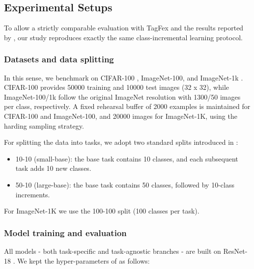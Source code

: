 \documentclass[letterpaper]{article} %
\begin{document}
\subsection{Experimental Setups}

To allow a strictly comparable evaluation with TagFex and the results reported by \citet{zheng2025task}, our study reproduces exactly the same class-incremental learning protocol. 

\subsubsection{Datasets and data splitting}
In this sense, we benchmark on CIFAR-100 \cite{Krizhevsky09}, ImageNet-100, and ImageNet-1k \cite{Deng:2009}. CIFAR-100 provides 50000 training and 10000 test images (32 x 32), while ImageNet-100/1k follow the original ImageNet resolution with 1300/50 images per class, respectively. A fixed rehearsal buffer of 2000 examples is maintained for CIFAR-100 and ImageNet-100, and 20000 images for ImageNet-1K, using the harding sampling strategy. 

For splitting the data into tasks, we adopt two standard splits introduced in \citet{zheng2025task}:
\begin{itemize}
    \item 10-10 (small-base): the base task contains 10 classes, and each subsequent task adds 10 new classes.
    \item 50-10 (large-base): the base task contains 50 classes, followed by 10-class increments.
\end{itemize}

For ImageNet-1K we use the 100-100 split (100 classes per task).

\subsubsection{Model training and evaluation}

All models - both task-specific and task-agnostic branches - are built on ResNet-18 \cite{He:2016}. We kept the hyper-parameters of \citet{zheng2025task} as follows:

\end{document}
